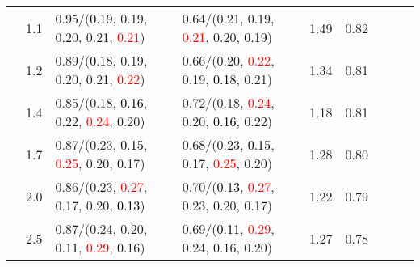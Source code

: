 \documentclass[10pt,a4paper]{report}
\begin{document}
\begin{table}[!htbp]
\begin{center}
{\begin{tabular}{ccllccccc}
				  & 1.1                               & 0.95/(\textcolor{black}{0.19}, 0.19, 0.20, 0.21, \textcolor{red}{0.21})                                                                                                                       & 0.64/(0.21, 0.19, \textcolor{red}{0.21}, 0.20, \textcolor{black}{0.19})                                                                                                                       & 1.49             & 0.82                     \\
				  & 1.2                               & 0.89/(\textcolor{black}{0.18}, 0.19, 0.20, 0.21, \textcolor{red}{0.22})                                                                                                                       & 0.66/(0.20, \textcolor{red}{0.22}, 0.19, \textcolor{black}{0.18}, 0.21)                                                                                                                       & 1.34             & 0.81                     \\
				  & 1.4                               & 0.85/(0.18, \textcolor{black}{0.16}, 0.22, \textcolor{red}{0.24}, 0.20)                                                                                                                       & 0.72/(0.18, \textcolor{red}{0.24}, 0.20, \textcolor{black}{0.16}, 0.22)                                                                                                                       & 1.18             & 0.81                     \\
				  & 1.7                               & 0.87/(0.23, \textcolor{black}{0.15}, \textcolor{red}{0.25}, 0.20, 0.17)                                                                                                                       & 0.68/(0.23, \textcolor{black}{0.15}, 0.17, \textcolor{red}{0.25}, 0.20)                                                                                                                       & 1.28             & 0.80                     \\
				  & 2.0                               & 0.86/(0.23, \textcolor{red}{0.27}, 0.17, 0.20, \textcolor{black}{0.13})                                                                                                                       & 0.70/(\textcolor{black}{0.13}, \textcolor{red}{0.27}, 0.23, 0.20, 0.17)                                                                                                                       & 1.22             & 0.79                     \\
				  & 2.5                               & 0.87/(0.24, 0.20, \textcolor{black}{0.11}, \textcolor{red}{0.29}, 0.16)                                                                                                                       & 0.69/(\textcolor{black}{0.11}, \textcolor{red}{0.29}, 0.24, 0.16, 0.20)                                                                                                                       & 1.27             & 0.78                     \\

\end{tabular}}
\end{center}
\end{table}
\end{document}
